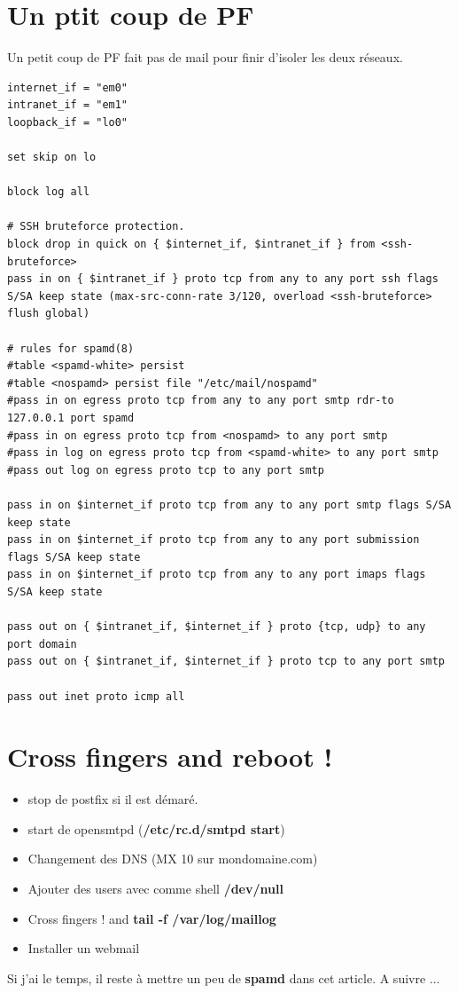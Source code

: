 \documentclass[a4paper,11pt]{article}
\begin{document}
\vspace{5mm}
\section*{Un ptit coup de PF}

Un petit coup de PF fait pas de mail pour finir d'isoler les deux réseaux. 
\vspace{5mm}
\begin{lstlisting}[caption={/etc/pf.conf},frame=bt,breaklines=true]
internet_if = "em0"
intranet_if = "em1"
loopback_if = "lo0"

set skip on lo

block log all

# SSH bruteforce protection.
block drop in quick on { $internet_if, $intranet_if } from <ssh-bruteforce> 
pass in on { $intranet_if } proto tcp from any to any port ssh flags S/SA keep state (max-src-conn-rate 3/120, overload <ssh-bruteforce> flush global) 

# rules for spamd(8)
#table <spamd-white> persist
#table <nospamd> persist file "/etc/mail/nospamd"
#pass in on egress proto tcp from any to any port smtp rdr-to 127.0.0.1 port spamd
#pass in on egress proto tcp from <nospamd> to any port smtp
#pass in log on egress proto tcp from <spamd-white> to any port smtp
#pass out log on egress proto tcp to any port smtp

pass in on $internet_if proto tcp from any to any port smtp flags S/SA keep state 
pass in on $internet_if proto tcp from any to any port submission flags S/SA keep state 
pass in on $internet_if proto tcp from any to any port imaps flags S/SA keep state 

pass out on { $intranet_if, $internet_if } proto {tcp, udp} to any port domain
pass out on { $intranet_if, $internet_if } proto tcp to any port smtp

pass out inet proto icmp all 
\end{lstlisting}

\vspace{5mm}
\section*{Cross fingers and reboot !}

\begin{itemize}
	\item stop de postfix si il est démaré.
	\item start de opensmtpd ({\bf /etc/rc.d/smtpd start})
	\item Changement des DNS (MX 10 sur mondomaine.com)
	\item Ajouter des users avec comme shell {\bf /dev/null}
	\item Cross fingers ! and {\bf tail -f /var/log/maillog}
	\item Installer un webmail
\end{itemize}
\vspace{5mm}
Si j'ai le temps, il reste à mettre un peu de {\bf spamd} dans cet article. A suivre ...
\end{document}
